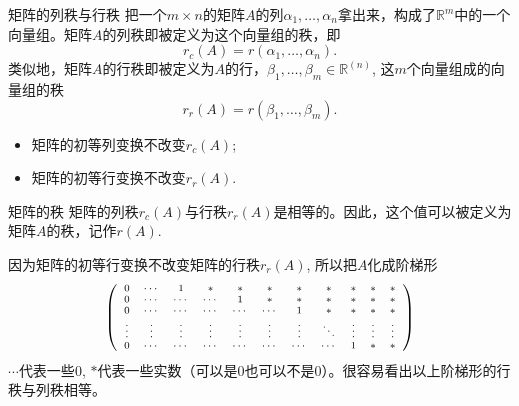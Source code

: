 \begin{frame}

\begin{block}{矩阵的列秩与行秩}
把一个$m\times n$的矩阵$A$的列$\alpha_1, \ldots, \alpha_n$拿出来，构成了$\mathbb{R}^m$中的一个向量组。矩阵$A$的列秩即被定义为这个向量组的秩，即
$$r_c(A) = r(\alpha_1, \ldots, \alpha_n).$$
类似地，矩阵$A$的行秩即被定义为$A$的行，$\beta_1, \ldots, \beta_m \in \mathbb{R}^{(n)}$, 这$m$个向量组成的向量组的秩
$$r_r(A) = r(\beta_1, \ldots, \beta_m).$$
\end{block}

\pause

\begin{thm}
\begin{itemize}
\item 矩阵的初等列变换不改变$r_c(A)$;
\item 矩阵的初等行变换不改变$r_r(A)$.
\end{itemize}
\end{thm}

\end{frame}


\begin{frame}

\begin{block}{矩阵的秩}
矩阵的列秩$r_c(A)$与行秩$r_r(A)$是相等的。因此，这个值可以被定义为矩阵$A$的秩，记作$r(A)$.
\end{block}

\pause

因为矩阵的初等行变换不改变矩阵的行秩$r_r(A)$, 所以把$A$化成阶梯形
\[
\scriptsize
\left(\begin{array}{*{11}c}
0 & \cdots & 1 & * & * & * & * & * & * & * & * \\ 0 & \cdots & \cdots & \cdots & 1 & * & * & * & * & * & * \\ 0 & \cdots & \cdots & \cdots & \cdots & \cdots & 1 & * & * & * & * \\ \vdots & \vdots & \vdots & \vdots & \vdots & \vdots & \vdots & \ddots & \vdots & \vdots & \vdots\\ 0 & \cdots & \cdots & \cdots & \cdots & \cdots & \cdots & \cdots & 1 & * & * \end{array}\right)
\]
$\cdots$代表一些$0$, $*$代表一些实数（可以是$0$也可以不是$0$）。很容易看出以上阶梯形的行秩与列秩相等。

\end{frame}

